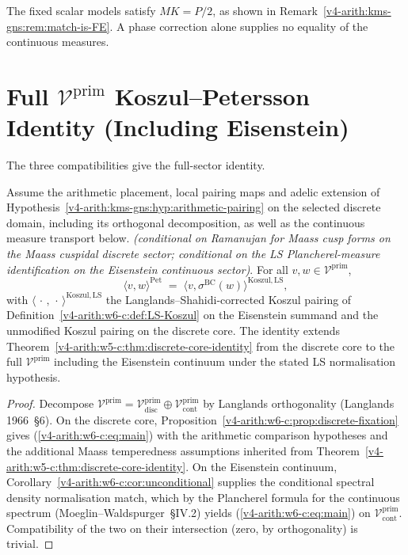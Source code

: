 The fixed scalar models satisfy \(MK=P/2\), as shown in
Remark~\ref{v4-arith:kms-gns:rem:match-is-FE}. A phase correction
alone supplies no equality of the continuous measures.

\section{Full \(\mathcal{V}^{\mathrm{prim}}\) Koszul--Petersson Identity (Including Eisenstein)}
\label{v4-arith:w6-c:LS:main}

The three compatibilities give the full-sector identity.

\begin{theorem}
\label{v4-arith:w6-c:thm:main}
Assume the arithmetic placement, local pairing maps and adelic
extension of Hypothesis~\ref{v4-arith:kms-gns:hyp:arithmetic-pairing}
on the selected discrete domain, including its orthogonal
decomposition, as well as the continuous measure transport below.
\emph{(conditional on Ramanujan for Maass
cusp forms on the Maass cuspidal discrete sector; conditional on the
LS Plancherel-measure identification on the Eisenstein continuous
sector)}. For all
\(v,w\in\mathcal{V}^{\mathrm{prim}}\),
\begin{equation}
\label{v4-arith:w6-c:eq:main}
\langle v,w\rangle^{\mathrm{Pet}}\;=\;\langle v,\sigma^{\mathrm{BC}}(w)\rangle^{\mathrm{Koszul},\mathrm{LS}},
\end{equation}
with \(\langle\,\cdot\,,\,\cdot\,\rangle^{\mathrm{Koszul},\mathrm{LS}}\)
the Langlands--Shahidi-corrected Koszul pairing of
Definition~\ref{v4-arith:w6-c:def:LS-Koszul} on the Eisenstein summand and
the unmodified Koszul pairing on the discrete core. The identity
extends
Theorem~\ref{v4-arith:w5-c:thm:discrete-core-identity} from the discrete
core to the full \(\mathcal{V}^{\mathrm{prim}}\) including the
Eisenstein continuum under the stated LS normalisation hypothesis.
\end{theorem}

\begin{proof}
Decompose
\(\mathcal{V}^{\mathrm{prim}}=\mathcal{V}^{\mathrm{prim}}_{\mathrm{disc}}\oplus\mathcal{V}^{\mathrm{prim}}_{\mathrm{cont}}\)
by Langlands orthogonality
(Langlands 1966~\S6). On the
discrete core,
Proposition~\ref{v4-arith:w6-c:prop:discrete-fixation} gives
(\ref{v4-arith:w6-c:eq:main}) with the arithmetic comparison hypotheses and the additional
Maass temperedness assumptions inherited from
Theorem~\ref{v4-arith:w5-c:thm:discrete-core-identity}. On the
Eisenstein continuum,
Corollary~\ref{v4-arith:w6-c:cor:unconditional} supplies the conditional spectral
density normalisation match, which by the Plancherel formula for
the continuous spectrum
(Moeglin--Waldspurger~\S IV.2) yields
(\ref{v4-arith:w6-c:eq:main}) on \(\mathcal{V}^{\mathrm{prim}}_{\mathrm{cont}}\).
Compatibility of the two on their intersection (zero, by
orthogonality) is trivial.
\end{proof}

